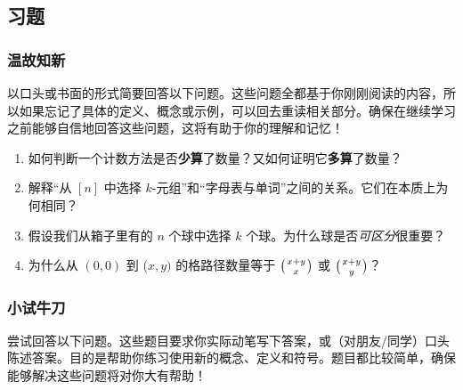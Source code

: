
\subsection{习题}

\subsubsection*{温故知新}

以口头或书面的形式简要回答以下问题。这些问题全都基于你刚刚阅读的内容，所以如果忘记了具体的定义、概念或示例，可以回去重读相关部分。确保在继续学习之前能够自信地回答这些问题，这将有助于你的理解和记忆！

\begin{enumerate}[label=(\arabic*)]
    \item 如何判断一个计数方法是否\textbf{少算}了数量？又如何证明它\textbf{多算}了数量？
    \item 解释``从 $[n]$ 中选择 $k$-元组''和``字母表与单词''之间的关系。它们在本质上为何相同？
    \item 假设我们从箱子里有的 $n$ 个球中选择 $k$ 个球。为什么球是否\emph{可区分}很重要？
    \item 为什么从 $(0, 0)$ 到 ($x, y)$ 的格路径数量等于 $\big({x+y \atop x}\big)$ 或 $\big({x+y \atop y}\big)$？
\end{enumerate}

\subsubsection*{小试牛刀}

尝试回答以下问题。这些题目要求你实际动笔写下答案，或（对朋友/同学）口头陈述答案。目的是帮助你练习使用新的概念、定义和符号。题目都比较简单，确保能够解决这些问题将对你大有帮助！


